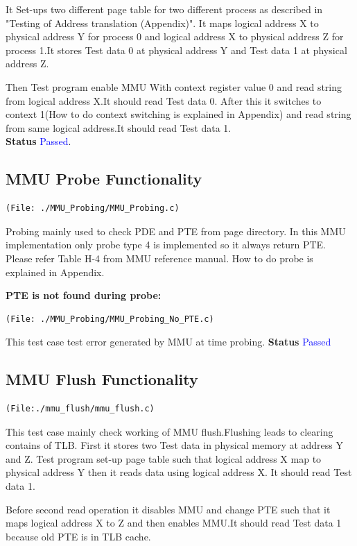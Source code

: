 \documentclass[12pt,a4paper]{article}
\begin{document}
 It Set-ups two different page table for two different process as described in "Testing of Address translation (Appendix)". It maps logical address X to physical address Y for process 0 and logical address X to physical address Z for process 1.It stores Test data 0 at physical address Y and Test data 1 at physical address Z.
 
Then Test program enable MMU With context register value 0 and read string from logical address X.It should read Test data 0. After this it switches to context 1(How to do context switching is explained in Appendix) and read string from same logical address.It should read Test data 1.\\
\textbf{Status} \textcolor{blue}{Passed}.

\subsection{MMU Probe Functionality} 
\begin{lstlisting}
(File: ./MMU_Probing/MMU_Probing.c)
\end{lstlisting}

Probing mainly used to check PDE and PTE from page directory. In this MMU implementation only probe type 4 is implemented so it always return PTE. Please refer Table H-4 from MMU reference manual. 
How to do probe is explained in Appendix.

\textbf{PTE is not found during probe:}
\begin{lstlisting}
(File: ./MMU_Probing/MMU_Probing_No_PTE.c)
\end{lstlisting}
This test case test error generated by MMU at time probing.
\textbf{Status} \textcolor{blue}{Passed} 

 
\subsection{MMU Flush Functionality} 
\begin{lstlisting}
(File:./mmu_flush/mmu_flush.c)
\end{lstlisting}

This test case mainly check working of MMU flush.Flushing leads to clearing contains of TLB. First it stores two Test data in physical memory at address Y and Z. Test program set-up page table such that logical address X map to physical address Y then it reads data using logical address X. It should read Test data 1.

	Before second read operation it disables MMU and change PTE such that it maps logical address X to Z and then enables MMU.It should read Test data 1 because old PTE is in TLB cache. 
\end{document}
